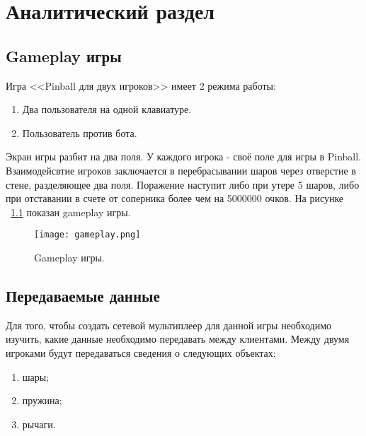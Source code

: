 \chapter{Аналитический раздел}

\section{Gameplay игры}

Игра <<Pinball для двух игроков>> имеет 2 режима работы:
\begin{enumerate}
\item Два пользователя на одной клавиатуре.
\item Пользователь против бота.
\end{enumerate}

Экран игры разбит на два поля. У каждого игрока - своё поле для игры в Pinball. Взаимодейсвтие игроков заключается в перебрасывании шаров через отверстие в стене, разделяющее два поля. Поражение наступит либо при утере 5 шаров, либо при отставании в счете от соперника более чем на 5000000 очков. На рисунке ~\ref{image:gameplay} показан gameplay игры. 

\begin{figure}[h]
  \centering
  \texttt{[image: gameplay.png]}
  \caption{Gameplay игры.}
  \label{image:gameplay}
\end{figure}

\section{Передаваемые данные}

Для того, чтобы создать сетевой мультиплеер для данной игры необходимо изучить, какие данные необходимо передавать между клиентами. Между двумя игроками будут передаваться сведения о следующих объектах:
\begin{enumerate}
\item шары;
\item пружина;
\item рычаги.
\end{enumerate}

